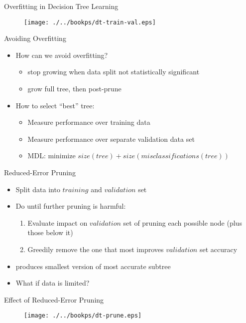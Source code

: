 \documentclass[%
pdf,
colorBG,
slideColor,
tcrico,
]{prosper}
\begin{document}
\begin{slide}{Overfitting in Decision Tree Learning } 
\begin{figure}
	\centering
	\texttt{[image: ./../bookps/dt-train-val.eps]}
\end{figure}
\end{slide}



\begin{slide}{\large Avoiding Overfitting \red \ } 
\begin{itemize}
 \item  How can we avoid overfitting?
	\begin{itemize}
	\item stop growing when data split not statistically significant
	\item grow full tree, then post-prune
	\end{itemize}
\item  How to select ``best'' tree:
	\begin{itemize}
	\item Measure performance over training data
	\item  Measure performance over separate validation data set
	\item MDL: minimize $size(tree) + size(misclassifications(tree))$
	\end{itemize}
\end{itemize}
\end{slide}


\begin{slide}{Reduced-Error Pruning } 
	\begin{itemize}
 	\item Split data into $training$ and $validation$ set
	\item Do until further pruning is harmful:
		\begin{enumerate}
 		\item Evaluate impact on $validation$ set of pruning each possible node (plus those below it)
		\item Greedily remove the one that most improves $validation$ set accuracy
		\end{enumerate}
	\item produces smallest version of most accurate subtree
	\item What if data is limited?
\end{itemize}
\end{slide}


\begin{slide}{Effect of Reduced-Error Pruning } 
\begin{figure}
	\centering
	\texttt{[image: ./../bookps/dt-prune.eps]}
\end{figure}
\end{slide}
\end{document}
